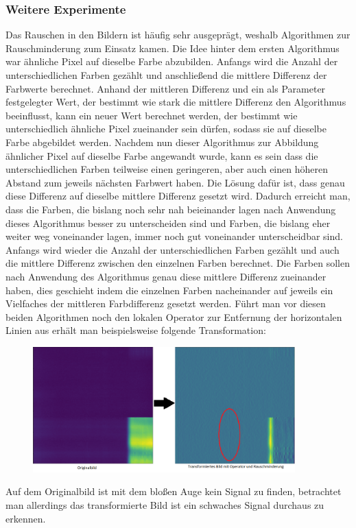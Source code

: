 \documentclass[11pt, a4paper]{article}
\begin{document}
\subsubsection{Weitere Experimente}
Das Rauschen in den Bildern ist häufig sehr ausgeprägt, weshalb Algorithmen zur Rauschminderung zum Einsatz kamen. Die Idee hinter dem ersten Algorithmus war ähnliche Pixel auf dieselbe Farbe abzubilden. Anfangs wird die Anzahl der unterschiedlichen Farben gezählt und anschließend die mittlere Differenz der Farbwerte berechnet. Anhand der mittleren Differenz und ein als Parameter festgelegter Wert, der bestimmt wie stark die mittlere Differenz den Algorithmus beeinflusst, kann ein neuer Wert berechnet werden, der bestimmt wie unterschiedlich ähnliche Pixel zueinander sein dürfen, sodass sie auf dieselbe Farbe abgebildet werden. 
\newline
Nachdem nun dieser Algorithmus zur Abbildung ähnlicher Pixel auf dieselbe Farbe angewandt wurde, kann es sein dass die unterschiedlichen Farben teilweise einen geringeren, aber auch einen höheren Abstand zum jeweils nächsten Farbwert haben. Die Lösung dafür ist, dass genau diese Differenz auf dieselbe mittlere Differenz gesetzt wird. Dadurch erreicht man, dass die Farben, die bislang noch sehr nah beieinander lagen nach Anwendung dieses Algorithmus besser zu unterscheiden sind und Farben, die bislang eher weiter weg voneinander lagen, immer noch gut voneinander unterscheidbar sind. Anfangs wird wieder die Anzahl der unterschiedlichen Farben gezählt und auch die mittlere Differenz zwischen den einzelnen Farben berechnet. Die Farben sollen nach Anwendung des Algorithmus genau diese mittlere Differenz zueinander haben, dies geschieht indem die einzelnen Farben nacheinander auf jeweils ein Vielfaches der mittleren Farbdifferenz gesetzt werden.
\newline
Führt man vor diesen beiden Algorithmen noch den lokalen Operator zur Entfernung der horizontalen Linien aus erhält man beispielsweise folgende Transformation:
\begin{figure}[h]
\centering
\includegraphics[width=0.9\textwidth]{img/original-vs-rauschminderung.png}
\end{figure}
\newline
Auf dem Originalbild ist mit dem bloßen Auge kein Signal zu finden, betrachtet man allerdings das transformierte Bild ist ein schwaches Signal durchaus zu erkennen.
\end{document}
